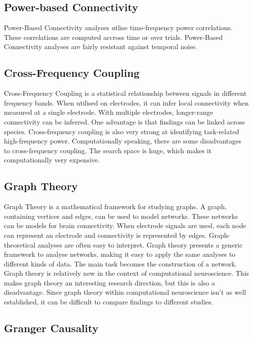 \subsection{Power-based Connectivity}

Power-Based Connectivity analyses utlise time-frequency power correlations. These correlations are computed accross time or over trials. Power-Based Connectivity analyses are fairly resistant against temporal noise.

\subsection{Cross-Frequency Coupling}

Cross-Frequency Coupling is a statistical relationship between signals in different frequency bands. When utilised on electrodes, it can infer local connectivity when measured at a single electrode. With multiple electrodes, longer-range connectivity can be inferred. One advantage is that findings can be linked across species. Cross-frequency coupling is also very strong at identifying task-related high-frequency power. Computationally speaking, there are some disadvantages to cross-frequency coupling. The search space is huge, which makes it computationally very expensive.

\subsection{Graph Theory}

Graph Theory is a mathematical framework for studying graphs. A graph, containing vertices and edges, can be used to model networks. These networks can be models for brain connectivity. When electrode signals are used, each node can represent an electrode and connectivity is represented by edges. Graph-theoretical analyses are often easy to interpret. Graph theory presents a generic framework to analyse networks, making it easy to apply the same analyses to different kinds of data. The main task becomes the construction of a network. Graph theory is relatively new in the context of computational neuroscience. This makes graph theory an interesting research direction, but this is also a disadvantage. Since graph theory within computational neuroscience isn't as well established, it can be difficult to compare findings to different studies.

\subsection{Granger Causality}

